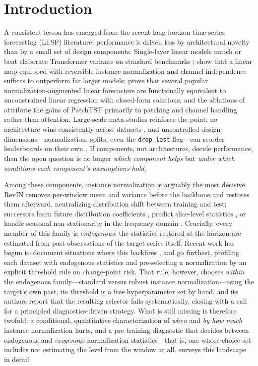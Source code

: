 \section{Introduction}\label{sec:intro}

A consistent lesson has emerged from the recent long-horizon time-series forecasting (LTSF) literature: performance is driven less by architectural novelty than by a small set of design components. Single-layer linear models match or beat elaborate Transformer variants on standard benchmarks \citep{zeng2023dlinear}; \citet{li2023rlinear} show that a linear map equipped with reversible instance normalization and channel independence suffices to outperform far larger models; \citet{toner2024linear} prove that several popular normalization-augmented linear forecasters are functionally equivalent to unconstrained linear regression with closed-form solutions; and the ablations of \citet{nie2023patchtst} attribute the gains of PatchTST primarily to patching and channel handling rather than attention. Large-scale meta-studies reinforce the point: no architecture wins consistently across datasets \citep{brigato2026champions}, and uncontrolled design dimensions---normalization, splits, even the \texttt{drop\_last} flag---can reorder leaderboards on their own \citep{qiu2024tfb, position2025benchmark}. If components, not architectures, decide performance, then the open question is no longer \emph{which component helps} but \emph{under which conditions each component's assumptions hold}.

Among these components, instance normalization is arguably the most decisive. RevIN \citep{kim2022revin} removes per-window mean and variance before the backbone and restores them afterward, neutralizing distribution shift between training and test; successors learn future distribution coefficients \citep{fan2023dishts}, predict slice-level statistics \citep{liu2023san}, or handle seasonal non-stationarity in the frequency domain \citep{ye2024fan}. Crucially, every member of this family is \emph{endogenous}: the statistics restored at the horizon are estimated from past observations of the target series itself. Recent work has begun to document situations where this backfires \citep{role2026revin, noise2025signal, inner2025instance}, and \citet{noise2025signal} go furthest, profiling each dataset with endogenous statistics and pre-selecting a normalization by an explicit threshold rule on change-point risk. That rule, however, chooses \emph{within} the endogenous family---standard versus robust instance normalization---using the target's own past, its threshold is a free hyperparameter set by hand, and its authors report that the resulting selector fails systematically, closing with a call for a principled diagnostics-driven strategy. What is still missing is therefore twofold: a conditional, quantitative characterization of \emph{when} and \emph{by how much} instance normalization hurts, and a pre-training diagnostic that decides between endogenous and \emph{exogenous} normalization statistics---that is, one whose choice set includes not estimating the level from the window at all.  surveys this landscape in detail.

